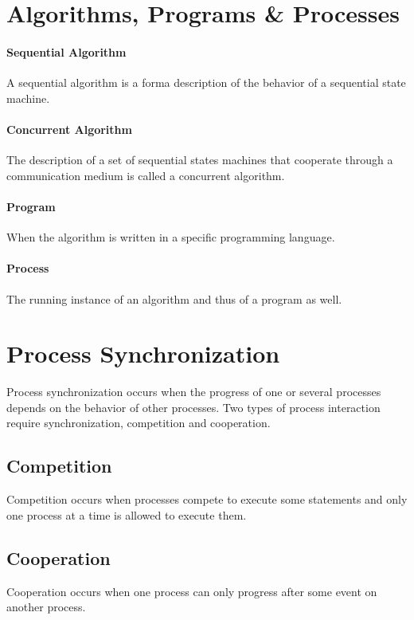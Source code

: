 \section{Algorithms, Programs \& Processes}

\paragraph{Sequential Algorithm}
A sequential algorithm is a forma description of the behavior of a sequential state machine.

\paragraph{Concurrent Algorithm}
The description of a set of sequential states machines that cooperate through a communication medium is called a concurrent algorithm.

\paragraph{Program}
When the algorithm is written in a specific programming language.

\paragraph{Process}
The running instance of an algorithm and thus of a program as well.

\section{Process Synchronization}
Process synchronization occurs when the progress of one or several processes depends on the behavior of other processes.
Two types of process interaction require synchronization, competition and cooperation.

\subsection{Competition}
Competition occurs when processes compete to execute some statements and only one process at a time is allowed to execute them.

\subsection{Cooperation}
Cooperation occurs when one process can only progress after some event on another process.

